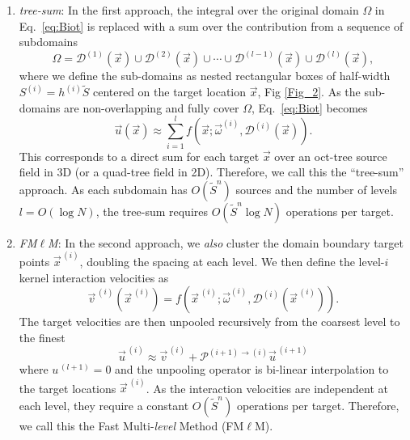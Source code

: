 \documentclass[final,1p,times]{elsarticle}
\begin{document}
\begin{enumerate}
    \item \textit{tree-sum}: In the first approach, the integral over the original domain $\Omega$ in Eq.~\ref{eq:Biot} is replaced with a sum over the contribution from a sequence of subdomains
    \begin{equation}\label{eq:multilevel}
        \Omega = \mathcal{D}^{(1)}(\vec x) \cup \mathcal{D}^{(2)}(\vec x) \cup \cdots \cup \mathcal{D}^{(l-1)}(\vec x) \cup \mathcal{D}^{(l)}(\vec x),
    \end{equation}
    where we define the sub-domains as nested rectangular boxes of half-width $S^{(i)}=h^{(i)}\tilde S$ centered on the target location $\vec x$, Fig \ref{Fig_2}. As the sub-domains are non-overlapping and fully cover $\Omega$, 
    Eq.~\ref{eq:Biot} becomes 
    \begin{equation}\label{eq:biot_sum}
        \vec u(\vec{x}) \approx \sum_{i=1}^{l} f(\vec{x}; \vec \omega^{(i)},\mathcal{D}^{(i)}(\vec x)).
    \end{equation}
    This corresponds to a direct sum for each target $\vec x$ over an oct-tree source field in 3D (or a quad-tree field in 2D). Therefore, we call this the ``tree-sum'' approach. As each subdomain has $O(\tilde S^n)$ sources and the number of levels $l=O(\log N)$, the tree-sum requires $O(\tilde S^n\log N)$ operations per target.
    \item \textit{FM$\ell$M}: In the second approach, we \textit{also} cluster the domain boundary target points $\vec  x^{\,(i)}$, doubling the spacing at each level. We then define the level-$i$ kernel interaction velocities as
    \begin{equation}\label{eq:interaction}
        \vec v^{\,(i)}(\vec x^{\,(i)}) = f(\vec x^{\,(i)}; \vec \omega^{(i)},\mathcal{D}^{(i)}(\vec x^{\,(i)})).
    \end{equation}
    The target velocities are then unpooled recursively from the coarsest level to the finest
    \begin{equation}\label{eq:unpool}
        \vec u^{\,(i)} \approx \vec v^{\,(i)}+\mathcal{P}^{(i+1)\to(i)} \vec u^{\,(i+1)}
    \end{equation}
    where $u^{\,(l+1)}=0$ and the unpooling operator is bi-linear interpolation to the target locations $\vec x^{\,(i)}$. As the interaction velocities are independent at each level, they require a constant $O(\tilde S^n)$ operations per target. Therefore, we call this the Fast Multi-\textit{level} Method (FM$\ell$M). 
\end{enumerate}
\end{document}
